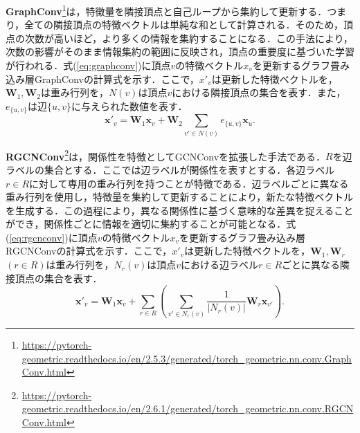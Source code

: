 \textbf{GraphConv}\footnote{\url{https://pytorch-geometric.readthedocs.io/en/2.5.3/generated/torch_geometric.nn.conv.GraphConv.html}}\cite{pyg-graphconv}は，特徴量を隣接頂点と自己ループから集約して更新する．つまり，全ての隣接頂点の特徴ベクトルは単純な和として計算される．そのため，頂点の次数が高いほど，より多くの情報を集約することになる．この手法により，次数の影響がそのまま情報集約の範囲に反映され，頂点の重要度に基づいた学習が行われる．式(\ref{eq:graphconv})に頂点$v$の特徴ベクトル$x_v$を更新するグラフ畳み込み層GraphConvの計算式を示す．ここで，$x'_v$は更新した特徴ベクトルを，$\textbf{W}_1,\textbf{W}_2$は重み行列を，$N(v)$は頂点$v$における隣接頂点の集合を表す．また，$e_{\{u,v\}}$は辺$\{u,v\}$に与えられた数値を表す．
\begin{equation}
  \label{eq:graphconv}
  \bm{x}'_{v}=\textbf{W}_{1}\bm{x}_{v}+\textbf{W}_{2}\sum_{v'\in N(v)}e_{\{u,v\}}\bm{x}_{u}.
\end{equation}

\textbf{RGCNConv}\footnote{\url{https://pytorch-geometric.readthedocs.io/en/2.6.1/generated/torch_geometric.nn.conv.RGCNConv.html}}\cite{pyg-rgcnconv}は，関係性を特徴としてGCNConvを拡張した手法である．$R$を辺ラベルの集合とする．ここでは辺ラベルが関係性を表すとする．各辺ラベル$r\in R$に対して専用の重み行列を持つことが特徴である．辺ラベルごとに異なる重み行列を使用し，特徴量を集約して更新することにより，新たな特徴ベクトルを生成する．この過程により，異なる関係性に基づく意味的な差異を捉えることができ，関係性ごとに情報を適切に集約することが可能となる．式(\ref{eq:rgcnconv})に頂点$v$の特徴ベクトル$x_v$を更新するグラフ畳み込み層RGCNConvの計算式を示す．ここで，$x'_v$は更新した特徴ベクトルを，$\textbf{W}_1,\textbf{W}_r$~$(r\in R)$は重み行列を，$N_r(v)$は頂点$v$における辺ラベル$r\in R$ごとに異なる隣接頂点の集合を表す．
\begin{equation}
  \label{eq:rgcnconv}
  \bm{x}'_{v}=\textbf{W}_{1}\bm{x}_{v}+\sum_{r\in R}\left(\sum_{v'\in N_{r}(v)}\frac{1}{|N_{r}(v)|}\textbf{W}_{r}\bm{x}_{v'}\right).
\end{equation}